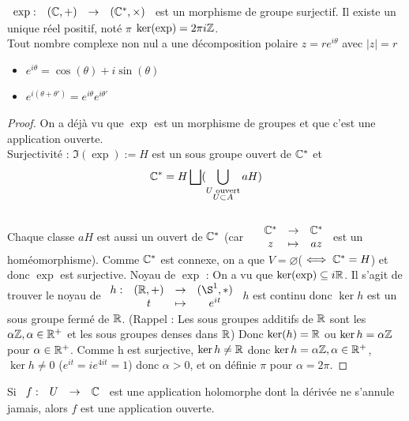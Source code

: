 \documentclass[]{report}
\begin{document}
\begin{tm}
    $\begin{array}{ccccc}
\exp : & (\mathbb{C},+) & \to & (\mathbb{C}^*,\times)
\end{array}$ est un morphisme de groupe surjectif. Il existe un unique réel positif, noté $\pi$ \tq $\ker(\exp)=2\pi i \mathbb{Z}$.\\
Tout nombre complexe non nul a une décomposition polaire $z=re^{i\theta}$ avec $|z|=r$\\
\begin{itemize}
    \item$e^{i\theta}=\cos(\theta)+i\sin(\theta)$
    \item $e^{i(\theta+\theta')}=e^{i\theta}e^{i\theta'}$
\end{itemize}
\end{tm}

\begin{proof}
    On a déjà vu que $\exp$ est un morphisme de groupes et que c'est une application ouverte.\\
    Surjectivité : $\Im(\exp):=H$ est un sous groupe ouvert de $\mathbb{C}^*$ et \[\mathbb{C}^*=H\bigsqcup(\bigcup_{\substack{U \text{ ouvert}\\U \subset A}}aH)\] \\
Chaque classe $aH$ est aussi un ouvert de $\mathbb{C}^*$ (car $\begin{array}{ccccc}
& \mathbb{C}^* & \to & \mathbb{C}^* \\
& z & \mapsto & az  
\end{array}$ est un homéomorphisme). Comme $\mathbb{C}^*$ est connexe, on a que $V=\varnothing $($\iff \mathbb{C}^*=H$) et donc $\exp$ est surjective. Noyau de $\exp$ : On a vu que $\ker(\exp)\subseteq i \mathbb{R}$. Il s'agit de trouver le noyau de $\begin{array}{ccccc}
h : & (\R,+) & \to & (\S^1,*) \\
  & t & \mapsto & e^{it}  
\end{array}$ $h$ est continu donc $\ker h$ est un sous groupe fermé de $\mathbb{R}$. (Rappel : Les sous groupes additifs de $\mathbb{R}$ sont les $\alpha \mathbb{Z} , \alpha\in\mathbb{R}^+$ et les sous groupes denses dans $\mathbb{R}$) Donc $\ker(h)=\mathbb{R}$ ou $\ker h=\alpha\mathbb{Z}$ pour $\alpha\in\mathbb{R}^+$. Comme h est surjective, $\ker h \neq\mathbb{R}$ donc $\ker h = \alpha \mathbb{Z}, \alpha\in \mathbb{R}^+$, $\ker h \neq 0$ ($e^{it}=ie^{4it}=1$) donc $\alpha>0$, et on définie $\pi$ pour $\alpha=2\pi$.
\end{proof}

\begin{cor}
    Si $\begin{array}{ccccc}
f : & U & \to & \mathbb{C}
\end{array}$ est une application holomorphe dont la dérivée ne s'annule jamais, alors $f$ est une application ouverte.
\end{cor}
\end{document}
